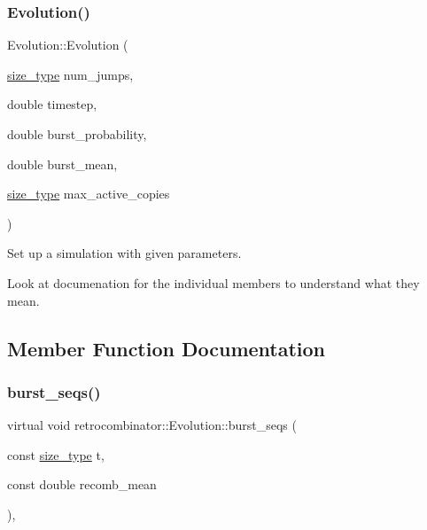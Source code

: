 \subsubsection{\texorpdfstring{Evolution()}{Evolution()}}
{\footnotesize\ttfamily Evolution\+::\+Evolution (\begin{DoxyParamCaption}\item[{\hyperlink{constants_8h_a8e1541b50cee66a791df4c437ccbb385}{size\+\_\+type}}]{num\+\_\+jumps,  }\item[{double}]{timestep,  }\item[{double}]{burst\+\_\+probability,  }\item[{double}]{burst\+\_\+mean,  }\item[{\hyperlink{constants_8h_a8e1541b50cee66a791df4c437ccbb385}{size\+\_\+type}}]{max\+\_\+active\+\_\+copies }\end{DoxyParamCaption})}



Set up a simulation with given parameters. 

Look at documenation for the individual members to understand what they mean. 

\subsection{Member Function Documentation}
\mbox{\label{classretrocombinator_1_1Evolution_abab94a3f14460300a6a3b7a0286236a6}} 
\subsubsection{\texorpdfstring{burst\+\_\+seqs()}{burst\_seqs()}}
{\footnotesize\ttfamily virtual void retrocombinator\+::\+Evolution\+::burst\+\_\+seqs (\begin{DoxyParamCaption}\item[{const \hyperlink{constants_8h_a8e1541b50cee66a791df4c437ccbb385}{size\+\_\+type}}]{t,  }\item[{const double}]{recomb\+\_\+mean }\end{DoxyParamCaption})\hspace{0.3cm}{\ttfamily [protected]}, {}}




